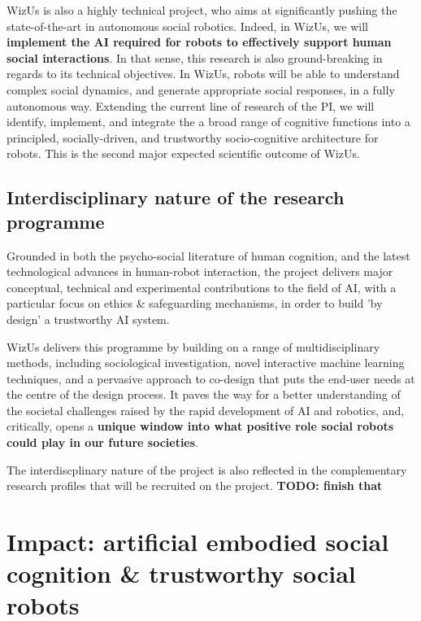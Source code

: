 \documentclass[11pt,a4paper]{report}
\newcommand{\project}{WizUs\xspace}
\newcommand{\TODO}[1]{{\color{red}\textbf{TODO: #1}}}
\begin{document}
\project is also a highly technical project, who aims at significantly
pushing the state-of-the-art in autonomous social robotics. Indeed, in \project, we will
\textbf{implement the AI required for robots to effectively support
human social interactions}.  In that sense, this research is also
ground-breaking in regards to its technical objectives. In \project, robots will
be able to understand complex social dynamics, and generate appropriate social
responses, in a fully autonomous way.  Extending the current line of research of
the PI, we will identify, implement, and integrate the a broad range of cognitive functions into a
principled, socially-driven, and trustworthy socio-cognitive architecture for
robots. This is the second major expected scientific outcome of \project.


\subsection{Interdisciplinary nature of the research programme}


Grounded in both the psycho-social literature of human cognition, and the latest
technological advances in human-robot interaction, the project delivers
major conceptual, technical and experimental contributions to the field of AI, 
with a particular focus on ethics \& safeguarding mechanisms, in order to build 'by 
design' a trustworthy AI system.

\project delivers this programme by building on a range of multidisciplinary
methods, including sociological investigation, novel interactive machine
learning techniques, and a pervasive approach to co-design that puts the
end-user needs at the centre of the design process. It paves the way for a
better understanding of the societal challenges raised by the rapid development
of AI and robotics, and, critically, opens a \textbf{unique window into what
positive role social robots could play in our future societies}.

The interdiscplinary nature of the project is also reflected in the
complementary research profiles that will be recruited on the project.
\TODO{finish that}


\section{Impact: artificial embodied social cognition \& trustworthy social robots}
\end{document}
